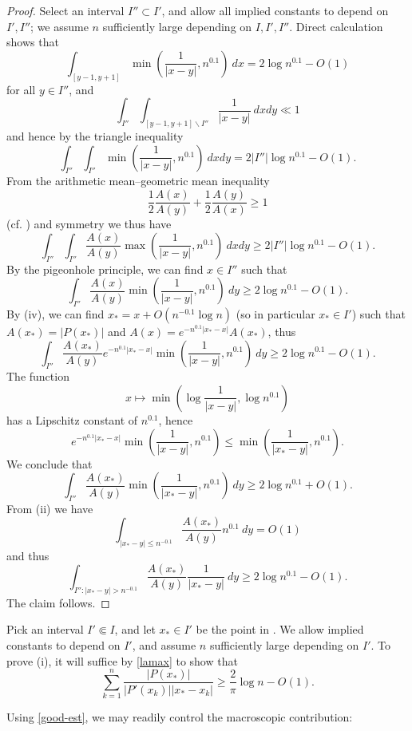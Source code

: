 \documentclass[12pt]{amsart}
\begin{document}
\begin{proof} Select an interval $I'' \subset I'$, and allow all implied constants to depend on $I', I''$; we assume $n$ sufficiently large depending on $I,I',I''$.  Direct calculation shows that
$$ \int_{[y-1,y+1]}\min\left( \frac{1}{|x-y|}, n^{0.1}\right) \ dx = 2 \log n^{0.1} - O(1)$$
for all $y \in I''$, and
$$ \int_{I''} \int_{[y-1,y+1] \backslash I''} \frac{1}{|x-y|}\ dx dy \ll 1$$
and hence by the triangle inequality
$$ \int_{I''} \int_{I''} \min\left( \frac{1}{|x-y|}, n^{0.1}\right) \ dx dy = 2 |I''| \log n^{0.1} - O(1).$$
From the arithmetic mean--geometric mean inequality
$$ \frac{1}{2} \frac{A(x)}{A(y)} + \frac{1}{2} \frac{A(y)}{A(x)} \geq 1$$
(cf. \cite[(3)]{esz}) and symmetry we thus have
$$ \int_{I''} \int_{I''} \frac{A(x)}{A(y)} \max\left( \frac{1}{|x-y|}, n^{0.1}\right)\ dx dy \geq 2 |I''| \log n^{0.1} - O(1).$$
By the pigeonhole principle, we can find $x \in I''$ such that
$$ \int_{I''} \frac{A(x)}{A(y)} \min\left( \frac{1}{|x-y|}, n^{0.1}\right)\ dy \geq 2 \log n^{0.1} - O(1).$$
By (iv), we can find $x_* = x +O(n^{-0.1} \log n)$ (so in particular $x_* \in I'$) such that $A(x_*) = |P(x_*)|$ and $A(x) = e^{-n^{0.1} |x_*-x|} A(x_*)$, thus
$$ \int_{I''} \frac{A(x_*)}{A(y)} e^{-n^{0.1} |x_*-x|} \min\left( \frac{1}{|x-y|}, n^{0.1}\right)\ dy \geq 2 \log n^{0.1} - O(1).$$
The function
$$ x \mapsto \min\left( \log \frac{1}{|x-y|}, \log n^{0.1} \right)$$
has a Lipschitz constant of $n^{0.1}$, hence
$$ e^{-n^{0.1} |x_*-x|} \min\left( \frac{1}{|x-y|}, n^{0.1}\right)
\leq \min\left( \frac{1}{|x_*-y|}, n^{0.1}\right).$$
We conclude that
$$ \int_{I''} \frac{A(x_*)}{A(y)} \min\left( \frac{1}{|x_*-y|}, n^{0.1}\right)\ dy \geq 2 \log n^{0.1} + O(1).$$
From (ii) we have
$$ \int_{|x_*-y| \leq n^{-0.1}} \frac{A(x_*)}{A(y)} n^{0.1}\ dy = O(1)$$
and thus
$$ \int_{I'': |x_*-y| > n^{-0.1}} \frac{A(x_*)}{A(y)} \frac{1}{|x_*-y|}\ dy \geq 2 \log n^{0.1} - O(1).$$
The claim follows.
\end{proof}

Pick an interval $I' \Subset I$, and let $x_* \in I'$ be the point in .  We allow implied constants to depend on $I'$, and assume $n$ sufficiently large depending on $I'$. To prove (i), it will suffice by \eqref{lamax} to show that
\begin{equation}\label{total}
 \sum_{k=1}^n \frac{|P(x_*)|}{|P'(x_k)| |x_*-x_k|} \geq \frac{2}{\pi} \log n - O(1).
\end{equation}

Using \eqref{good-est}, we may readily control the macroscopic contribution:
\end{document}
